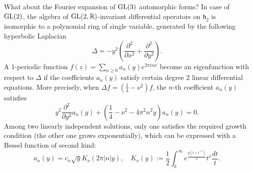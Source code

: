 What about the Fourier expansion of $\operatorname{\mathrm{GL}}(3)$ automorphic forms?
In case of $\operatorname{\mathrm{GL}}(2)$, the algebra of $\operatorname{\mathrm{GL}}(2, \mathbb{R})$-invariant differential operators on $\mathfrak{h}_{2}$ is isomorphic to a polynomial ring of single variable, generated by the following hyperbolic Laplacian
$$
\Delta = -y^{2} \left(\frac{\partial^{2}}{\partial x^{2}} + \frac{\partial^{2}}{\partial y^{2}}\right).
$$
A 1-periodic function $f(z) = \sum_{n\geq 0} a_{n}(y)e^{2\pi i n x}$ become an eigenfunction with respect to $\Delta$ if the coefficients $a_{n}(y)$ satisfy certain degree 2 linear differential equations.
More precisely, when $\Delta f = \left( \frac{1}{4} - \nu^{2}\right) f$, the $n$-th coefficient $a_{n}(y)$ satisfies
$$
y^{2} \frac{\partial^{2}}{\partial y^{2}}a_{n}(y) + \left(\frac{1}{4} - \nu^{2} - 4\pi^{2}n^{2}y\right)a_{n}(y) = 0.
$$
Among two linearly independent solutions, only one satisfies the required growth condition (the other one grows exponentially), which can be expressed with a Bessel function of second kind:
$$
a_{n}(y) = c_{n} \sqrt{y}K_{\nu}(2\pi |n|y), \quad K_{\nu}(y) := \frac{1}{2}\int_{0}^{\infty}e^{\frac{y(t + t^{-1})}{2}}t^{\nu} \frac{dt}{t}.
$$

